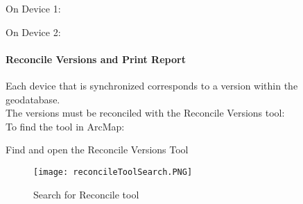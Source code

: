  \vspace{.5in}

 \noindent On Device 1:

 \vspace{.75in}


 \vspace{1.75in}

 \noindent On Device 2:

 \vspace{.75in}


 \clearpage









 \paragraph{Reconcile Versions and Print Report}


 \vspace{.25in}

 Each device that is synchronized corresponds to a version within the geodatabase.\\

 \noindent The versions must be reconciled with the Reconcile Versions tool:\\
 
 \noindent To find the tool {\LARGE in ArcMap:}\\



 \noindent Find and open the Reconcile Versions Tool
 \vspace{.5in}

 \vspace{.5in}


   \begin{figure}[h!]
   
     \texttt{[image: reconcileToolSearch.PNG]}
 \caption{Search for Reconcile tool}
 
\end{figure}


